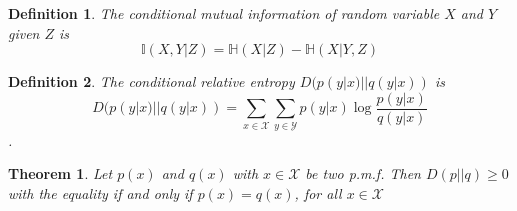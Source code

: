 \documentclass[11pt]{article}
\newtheorem{theorem}{Theorem}[section]
\newtheorem{definition}{Definition}[section]
\begin{document}
\begin{definition}
The conditional mutual information of random variable $X$ and $Y$ given $Z$ is
$$\mathbb{I}(X,Y|Z)=\mathbb{H}(X|Z)-\mathbb{H}(X|Y,Z)$$
\end{definition}
\begin{definition}
The conditional relative entropy $D(p(y|x)||q(y|x))$ is
$$D(p(y|x)||q(y|x))=\sum\limits_{x \in \mathcal{X}}\sum\limits_{y \in \mathcal{Y}}p(y|x)\log \frac{p(y|x)}{q(y|x)}$$.

\end{definition}
\begin{theorem}
Let $p(x)$ and $q(x)$ with $x \in \mathcal{X}$ be two p.m.f. Then $D(p||q)\geq0$ with the equality if and only if $p(x)=q(x)$, for all $x \in \mathcal{X}$
\end{theorem}
\end{document}
